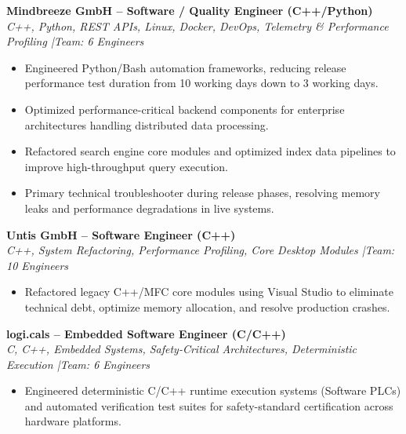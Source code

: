 \documentclass[10pt,a4paper]{article}
\begin{document}

\textbf{Mindbreeze GmbH -- Software / Quality Engineer (C++/Python)} \\
\textit{C++, Python, REST APIs, Linux, Docker, DevOps, Telemetry \& Performance Profiling \quad|\quad Team: 6 Engineers}
\begin{itemize}
    \item Engineered Python/Bash automation frameworks, reducing release performance test duration from 10 working days down to 3 working days.
    \item Optimized performance-critical backend components for enterprise architectures handling distributed data processing.
    \item Refactored search engine core modules and optimized index data pipelines to improve high-throughput query execution.
    \item Primary technical troubleshooter during release phases, resolving memory leaks and performance degradations in live systems.
\end{itemize}

\vspace{0.15cm}
\textbf{Untis GmbH -- Software Engineer (C++)} \\
\textit{C++, System Refactoring, Performance Profiling, Core Desktop Modules \quad|\quad Team: 10 Engineers}
\begin{itemize}
    \item Refactored legacy C++/MFC core modules using Visual Studio to eliminate technical debt, optimize memory allocation, and resolve production crashes.
\end{itemize}

\vspace{0.15cm}
\textbf{logi.cals -- Embedded Software Engineer (C/C++)} \\
\textit{C, C++, Embedded Systems, Safety-Critical Architectures, Deterministic Execution \quad|\quad Team: 6 Engineers}
\begin{itemize}
    \item Engineered deterministic C/C++ runtime execution systems (Software PLCs) and automated verification test suites for safety-standard certification across hardware platforms.
\end{itemize}
\end{document}
